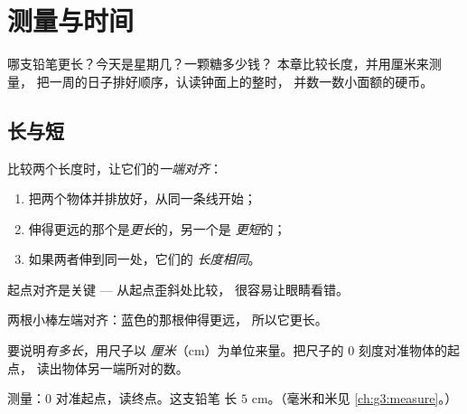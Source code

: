 \chapter{测量与时间}\label{ch:g1:measure}

哪支铅笔更长？今天是星期几？一颗糖多少钱？
本章比较长度，并用厘米来测量，
把一周的日子排好顺序，认读钟面上的整时，
并数一数小面额的硬币。

\section{长与短}

\begin{method}[比较长度]\label{met:g1:measure:compare}
比较两个长度时，让它们的\emph{一端对齐}：
\begin{enumerate}
  \item 把两个物体并排放好，从同一条线开始；
  \item 伸得更远的那个是\emph{更长}的，另一个是
        \emph{更短}的；
  \item 如果两者伸到同一处，它们的\emph{
        长度相同}。
\end{enumerate}
起点对齐是关键 --- 从起点歪斜处比较，
很容易让眼睛看错。
\end{method}

\begin{omfigure}

{\small 两根小棒左端对齐：蓝色的那根伸得更远，
所以它更长。}
\end{omfigure}

\begin{definition}[厘米]\label{def:g1:measure:cm}
要说明\emph{有多长}，用尺子以
\emph{厘米}（cm）为单位来量。把尺子的 $0$ 刻度对准物体的起点，
读出物体另一端所对的数。
\end{definition}

\begin{omfigure}

{\small 测量：$0$ 对准起点，读终点。这支铅笔
长 $5$ cm。（毫米和米见
\cref{ch:g3:measure}。）}
\end{omfigure}

